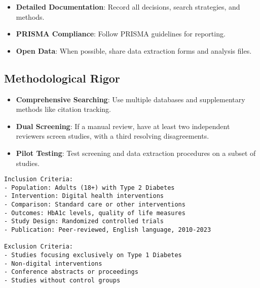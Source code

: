 \begin{itemize}
    \item \textbf{Detailed Documentation}: Record all decisions, search strategies, and methods.
    \item \textbf{PRISMA Compliance}: Follow PRISMA guidelines for reporting.
    \item \textbf{Open Data}: When possible, share data extraction forms and analysis files.
\end{itemize}

\subsection{Methodological Rigor}

\begin{itemize}
    \item \textbf{Comprehensive Searching}: Use multiple databases and supplementary methods like citation tracking.
    \item \textbf{Dual Screening}: If a manual review, have at least two independent reviewers screen studies, with a third resolving disagreements.
    \item \textbf{Pilot Testing}: Test screening and data extraction procedures on a subset of studies.
\end{itemize}

\begin{infobox}
\begin{lstlisting}
Inclusion Criteria:
- Population: Adults (18+) with Type 2 Diabetes
- Intervention: Digital health interventions
- Comparison: Standard care or other interventions
- Outcomes: HbA1c levels, quality of life measures
- Study Design: Randomized controlled trials
- Publication: Peer-reviewed, English language, 2010-2023

Exclusion Criteria:
- Studies focusing exclusively on Type 1 Diabetes
- Non-digital interventions
- Conference abstracts or proceedings
- Studies without control groups
\end{lstlisting}
\end{infobox}

